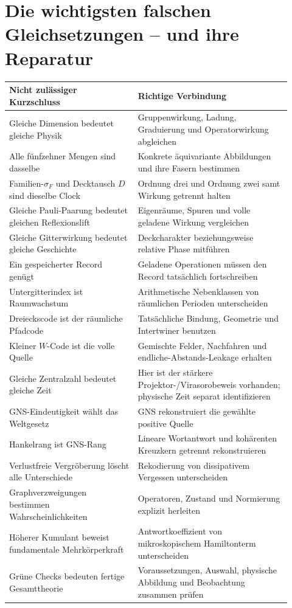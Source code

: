 \section{Die wichtigsten falschen Gleichsetzungen -- und ihre Reparatur}
\begin{longtable}{L{0.42\linewidth}L{0.50\linewidth}}
\toprule
Nicht zulässiger Kurzschluss & Richtige Verbindung\\\midrule\endhead
Gleiche Dimension bedeutet gleiche Physik & Gruppenwirkung, Ladung, Graduierung und Operatorwirkung abgleichen\\
Alle fünfzehner Mengen sind dasselbe & Konkrete äquivariante Abbildungen und ihre Fasern bestimmen\\
Familien-$\sigma_F$ und Decktausch $D$ sind dieselbe Clock & Ordnung drei und Ordnung zwei samt Wirkung getrennt halten\\
Gleiche Pauli-Paarung bedeutet gleichen Reflexionslift & Eigenräume, Spuren und volle geladene Wirkung vergleichen\\
Gleiche Gitterwirkung bedeutet gleiche Geschichte & Deckcharakter beziehungsweise relative Phase mitführen\\
Ein gespeicherter Record genügt & Geladene Operationen müssen den Record tatsächlich fortschreiben\\
Untergitterindex ist Raumwachstum & Arithmetische Nebenklassen von räumlichen Perioden unterscheiden\\
Dreieckscode ist der räumliche Pfadcode & Tatsächliche Bindung, Geometrie und Intertwiner benutzen\\
Kleiner $W$-Code ist die volle Quelle & Gemischte Felder, Nachfahren und endliche-Abstands-Leakage erhalten\\
Gleiche Zentralzahl bedeutet gleiche Zeit & Hier ist der stärkere Projektor-/Virasorobeweis vorhanden; physische Zeit separat identifizieren\\
GNS-Eindeutigkeit wählt das Weltgesetz & GNS rekonstruiert die gewählte positive Quelle\\
Hankelrang ist GNS-Rang & Lineare Wortantwort und kohärenten Kreuzkern getrennt rekonstruieren\\
Verlustfreie Vergröberung löscht alle Unterschiede & Rekodierung von dissipativem Vergessen unterscheiden\\
Graphverzweigungen bestimmen Wahrscheinlichkeiten & Operatoren, Zustand und Normierung explizit herleiten\\
Höherer Kumulant beweist fundamentale Mehrkörperkraft & Antwortkoeffizient von mikroskopischem Hamiltonterm unterscheiden\\
Grüne Checks bedeuten fertige Gesamttheorie & Voraussetzungen, Auswahl, physische Abbildung und Beobachtung zusammen prüfen\\\bottomrule
\end{longtable}


